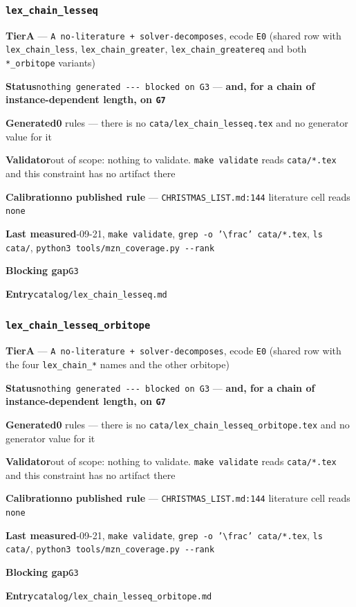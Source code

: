 \documentclass[10pt,a4paper]{article}
\newcommand{\entryfield}[2]{{\raggedright\textbf{#1}\quad #2\par}}
\begin{document}
\subsubsection*{\texttt{lex\_\allowbreak{}chain\_\allowbreak{}lesseq}}
\label{entry:lex-chain-lesseq}
\entryfield{Tier}{\textbf{A} --- \texttt{A no-\allowbreak{}literature + solver-\allowbreak{}decomposes}, ecode \texttt{E0} (shared row with \texttt{lex\_chain\_less}, \texttt{lex\_chain\_greater}, \texttt{lex\_chain\_greatereq} and both \texttt{*\_orbitope} variants)}
\entryfield{Status}{\texttt{nothing generated -\allowbreak{}-\allowbreak{}-\allowbreak{} blocked on G3} --- \textbf{and, for a chain of instance-dependent length, on \texttt{G7}}}
\entryfield{Generated}{\textbf{0} rules --- there is no \texttt{cata/\allowbreak{}lex\_\allowbreak{}chain\_\allowbreak{}lesseq.\allowbreak{}tex} and no generator value for it}
\entryfield{Validator}{out of scope: nothing to validate. \texttt{make validate} reads \texttt{cata/*.tex} and this constraint has no artifact there}
\entryfield{Calibration}{\textbf{no published rule} --- \texttt{CHRISTMAS\_LIST.md:144} literature cell reads \texttt{none}}
\entryfield{Last measured}{2026-09-21, \texttt{make validate}, \texttt{grep -\allowbreak{}o '\textbackslash{}frac' cata/\allowbreak{}*.\allowbreak{}tex}, \texttt{ls cata/}, \texttt{python3 tools/\allowbreak{}mzn\_\allowbreak{}coverage.\allowbreak{}py -\allowbreak{}-\allowbreak{}rank}}
\entryfield{Blocking gap}{\texttt{G3}}
\entryfield{Entry}{\texttt{catalog/lex\_chain\_lesseq.md}}
\subsubsection*{\texttt{lex\_\allowbreak{}chain\_\allowbreak{}lesseq\_\allowbreak{}orbitope}}
\label{entry:lex-chain-lesseq-orbitope}
\entryfield{Tier}{\textbf{A} --- \texttt{A no-\allowbreak{}literature + solver-\allowbreak{}decomposes}, ecode \texttt{E0} (shared row with the four \texttt{lex\_chain\_*} names and the other orbitope)}
\entryfield{Status}{\texttt{nothing generated -\allowbreak{}-\allowbreak{}-\allowbreak{} blocked on G3} --- \textbf{and, for a chain of instance-dependent length, on \texttt{G7}}}
\entryfield{Generated}{\textbf{0} rules --- there is no \texttt{cata/\allowbreak{}lex\_\allowbreak{}chain\_\allowbreak{}lesseq\_\allowbreak{}orbitope.\allowbreak{}tex} and no generator value for it}
\entryfield{Validator}{out of scope: nothing to validate. \texttt{make validate} reads \texttt{cata/*.tex} and this constraint has no artifact there}
\entryfield{Calibration}{\textbf{no published rule} --- \texttt{CHRISTMAS\_LIST.md:144} literature cell reads \texttt{none}}
\entryfield{Last measured}{2026-09-21, \texttt{make validate}, \texttt{grep -\allowbreak{}o '\textbackslash{}frac' cata/\allowbreak{}*.\allowbreak{}tex}, \texttt{ls cata/}, \texttt{python3 tools/\allowbreak{}mzn\_\allowbreak{}coverage.\allowbreak{}py -\allowbreak{}-\allowbreak{}rank}}
\entryfield{Blocking gap}{\texttt{G3}}
\entryfield{Entry}{\texttt{catalog/lex\_chain\_lesseq\_orbitope.md}}
\end{document}
